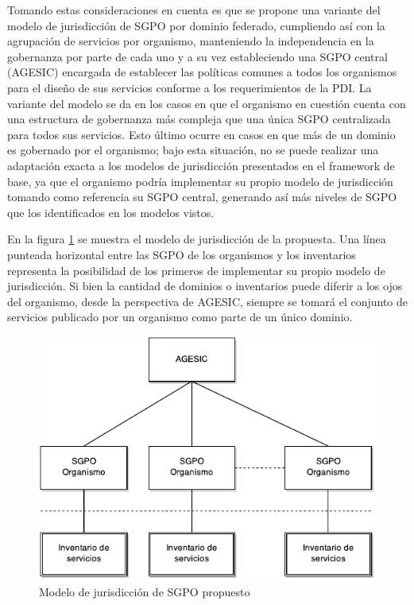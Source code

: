 \documentclass[11pt]{article}
\begin{document}
			Tomando estas consideraciones en cuenta es que se propone una variante del modelo de jurisdicción de SGPO por dominio federado, cumpliendo así con la agrupación de servicios por organismo, manteniendo la independencia en la gobernanza por parte de cada uno y a su vez estableciendo una SGPO central (AGESIC) encargada de establecer las políticas comunes a todos los organismos para el diseño de sus servicios conforme a los requerimientos de la PDI. La variante del modelo se da en los casos en que el organismo en cuestión cuenta con una estructura de gobernanza más compleja que una única SGPO centralizada para todos sus servicios. Esto último ocurre en casos en que más de un dominio es gobernado por el organismo; bajo esta situación, no se puede realizar una adaptación exacta a los modelos de jurisdicción presentados en el framework de base, ya que el organismo podría implementar su propio modelo de jurisdicción tomando como referencia su SGPO central, generando así más niveles de SGPO que los identificados en los modelos vistos.

			En la figura \ref{imagen:modelo_jurisdiccion_sgpo_propuesta} se muestra el modelo de jurisdicción de la propuesta. Una línea punteada horizontal entre las SGPO de los organismos y los inventarios representa la posibilidad de los primeros de implementar su propio modelo de jurisdicción. Si bien la cantidad de dominios o inventarios puede diferir a los ojos del organismo, desde la perspectiva de AGESIC, siempre se tomará el conjunto de servicios publicado por un organismo como parte de un único dominio.

			\begin{figure}
				\centering
				\includegraphics[width=\linewidth]{modelo_jurisdiccion_sgpo_propuesta}
				\caption{Modelo de jurisdicción de SGPO propuesto}
				\label{imagen:modelo_jurisdiccion_sgpo_propuesta}
			\end{figure}
\end{document}
